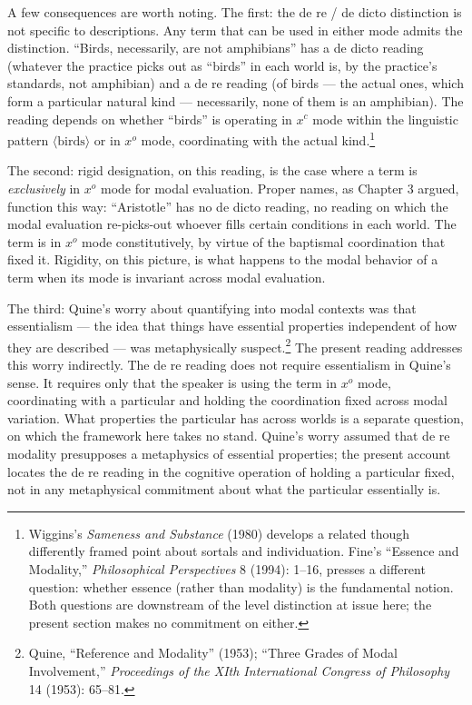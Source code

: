 \documentclass[10pt]{article}
\newcounter{none}%
\begin{document}
A few consequences are worth noting. The first: the de re / de dicto distinction is not specific to descriptions. Any term that can be used in either mode admits the distinction. ``Birds, necessarily, are not amphibians'' has a de dicto reading (whatever the practice picks out as ``birds'' in each world is, by the practice's standards, not amphibian) and a de re reading (of birds --- the actual ones, which form a particular natural kind --- necessarily, none of them is an amphibian). The reading depends on whether ``birds'' is operating in \(x^c\) mode within the linguistic pattern \(\langle \text{birds} \rangle\) or in \(x^o\) mode, coordinating with the actual kind.\footnote{Wiggins's \emph{Sameness and Substance} (1980) develops a related though differently framed point about sortals and individuation. Fine's ``Essence and Modality,'' \emph{Philosophical Perspectives} 8 (1994): 1--16, presses a different question: whether essence (rather than modality) is the fundamental notion. Both questions are downstream of the level distinction at issue here; the present section makes no commitment on either.}

The second: rigid designation, on this reading, is the case where a term is \emph{exclusively} in \(x^o\) mode for modal evaluation. Proper names, as Chapter 3 argued, function this way: ``Aristotle'' has no de dicto reading, no reading on which the modal evaluation re-picks-out whoever fills certain conditions in each world. The term is in \(x^o\) mode constitutively, by virtue of the baptismal coordination that fixed it. Rigidity, on this picture, is what happens to the modal behavior of a term when its mode is invariant across modal evaluation.

The third: Quine's worry about quantifying into modal contexts was that essentialism --- the idea that things have essential properties independent of how they are described --- was metaphysically suspect.\footnote{Quine, ``Reference and Modality'' (1953); ``Three Grades of Modal Involvement,'' \emph{Proceedings of the XIth International Congress of Philosophy} 14 (1953): 65--81.} The present reading addresses this worry indirectly. The de re reading does not require essentialism in Quine's sense. It requires only that the speaker is using the term in \(x^o\) mode, coordinating with a particular and holding the coordination fixed across modal variation. What properties the particular has across worlds is a separate question, on which the framework here takes no stand. Quine's worry assumed that de re modality presupposes a metaphysics of essential properties; the present account locates the de re reading in the cognitive operation of holding a particular fixed, not in any metaphysical commitment about what the particular essentially is.
\end{document}
